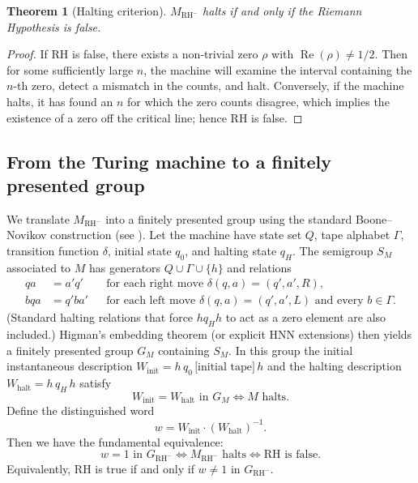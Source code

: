 \documentclass[11pt,a4paper]{article}
\newtheorem{theorem}{Theorem}[section]
\begin{document}
\begin{theorem}[Halting criterion]\label{thm:halting}
\(M_{\text{RH}^-}\) halts if and only if the Riemann Hypothesis is false.
\end{theorem}
\begin{proof}
If RH is false, there exists a non‑trivial zero \(\rho\) with \(\operatorname{Re}(\rho) \neq 1/2\). Then for some sufficiently large $n$, the machine will examine the interval containing the $n$-th zero, detect a mismatch in the counts, and halt. Conversely, if the machine halts, it has found an $n$ for which the zero counts disagree, which implies the existence of a zero off the critical line; hence RH is false.
\end{proof}

\subsection{From the Turing machine to a finitely presented group}
We translate \(M_{\text{RH}^-}\) into a finitely presented group using the standard Boone–Novikov construction (see \cite{boone,novikov}). Let the machine have state set \(Q\), tape alphabet \(\Gamma\), transition function \(\delta\), initial state \(q_0\), and halting state \(q_H\). The semigroup \(S_{M}\) associated to \(M\) has generators \(Q \cup \Gamma \cup \{h\}\) and relations
\begin{align*}
q a &= a' q' &&\text{for each right move } \delta(q,a) = (q',a',R),\\
b q a &= q' b a' &&\text{for each left move } \delta(q,a) = (q',a',L) \text{ and every } b \in \Gamma.
\end{align*}
(Standard halting relations that force \(h q_H h\) to act as a zero element are also included.)
Higman's embedding theorem (or explicit HNN extensions) then yields a finitely presented group \(G_M\) containing \(S_M\). In this group the initial instantaneous description \(W_{\text{init}} = h\, q_0\, \text{[initial tape]}\, h\) and the halting description \(W_{\text{halt}} = h\, q_H\, h\) satisfy
\[
W_{\text{init}} = W_{\text{halt}} \text{ in } G_M \iff M \text{ halts}.
\]
Define the distinguished word
\[
w = W_{\text{init}} \cdot (W_{\text{halt}})^{-1}.
\]
Then we have the fundamental equivalence:
\begin{equation}\label{eq:main}
w = 1 \text{ in } G_{\text{RH}^-} \iff M_{\text{RH}^-} \text{ halts} \iff \text{RH is false.}
\end{equation}
Equivalently, RH is true if and only if \(w \neq 1\) in \(G_{\text{RH}^-}\).
\end{document}
